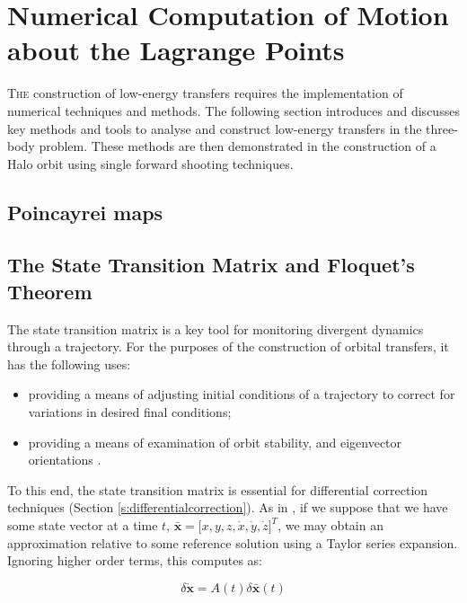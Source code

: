 \chapter{Numerical Computation of Motion about the Lagrange Points}

\lettrine{T}{he} construction of low-energy transfers requires the implementation of numerical techniques and methods. The following section introduces and discusses key methods and tools to analyse and construct low-energy transfers in the three-body problem. These methods are then demonstrated in the construction of a Halo orbit using single forward shooting techniques.

\section{Poincayrei maps}

\section{The State Transition Matrix and Floquet's Theorem}

The state transition matrix is a key tool for monitoring divergent dynamics through a trajectory. For the purposes of the construction of orbital transfers, it has the following uses:

\begin{itemize}
\item  providing a means of adjusting initial conditions of a trajectory to correct for variations in desired final conditions;
\item providing a means of examination of orbit stability, and eigenvector orientations \citep{Parker2014}.
\end{itemize}

 To this end, the state transition matrix is essential for differential correction techniques (Section \ref{s:differentialcorrection}). As in \citep{Howell1997}, if we suppose that we have some state vector at a time $t$, $\pmb{\bar{x}} = [ x, y, z, \dot{x}, \dot{y}, \dot{z} \big ]^T$, we may obtain an approximation relative to some reference solution using a Taylor series expansion. Ignoring higher order terms, this computes as:
 
 \begin{equation}\label{eq:taylorseriesstatematrix}
 \delta \pmb{\dot{x}} = A\left(t\right) \delta \pmb{\bar x} \left(t\right)
 \end{equation}

